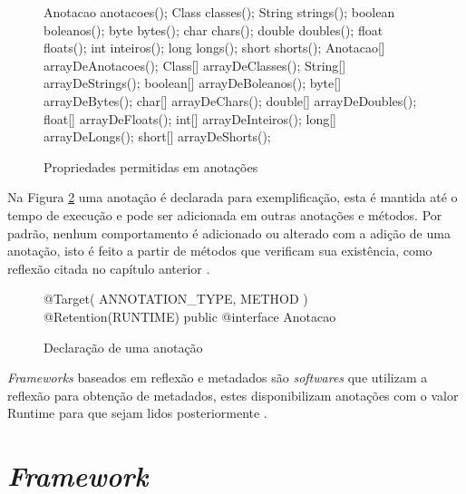 \begin{figure}[H]
    \centering
    \caption{Propriedades permitidas em anotações}
    \begin{java}
Anotacao anotacoes();
Class classes();
String strings();
boolean boleanos();
byte bytes();
char chars();
double doubles();
float floats();
int inteiros();
long longs();	
short shorts();
Anotacao[] arrayDeAnotacoes();
Class[] arrayDeClasses();
String[] arrayDeStrings();
boolean[] arrayDeBoleanos();
byte[] arrayDeBytes();
char[] arrayDeChars();
double[] arrayDeDoubles();
float[] arrayDeFloats();
int[] arrayDeInteiros();
long[] arrayDeLongs();	
short[] arrayDeShorts();
    \end{java}
    \label{fig:propriedades-anotacoes}
\end{figure}

\par Na Figura \ref{fig:declaracao-anotacao} uma anotação é declarada para exemplificação, esta é mantida até o tempo de execução e pode ser adicionada em outras anotações e métodos. Por padrão, nenhum comportamento é adicionado ou alterado com a adição de uma anotação, isto é feito a partir de métodos que verificam sua existência, como reflexão citada no capítulo anterior \cite{bloch2004jsr}. 

\begin{figure}[H]
    \centering
    \caption{Declaração de uma anotação}
    \begin{java}
@Target({ ANNOTATION_TYPE, METHOD })
@Retention(RUNTIME)
public @interface Anotacao {
}
    \end{java}
    \label{fig:declaracao-anotacao}
\end{figure}

\textit{Frameworks} baseados em reflexão e metadados são \textit{softwares} que utilizam a reflexão para obtenção de metadados, estes disponibilizam anotações com o valor Runtime para que sejam lidos posteriormente \cite{guerra2009pattern}.

\section{\textit{Framework}}

